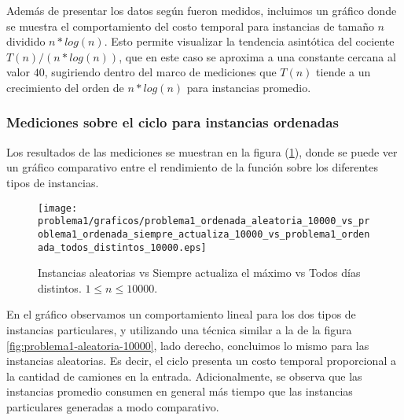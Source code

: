 Además de presentar los datos según fueron medidos, incluimos un gráfico donde se muestra el comportamiento del costo temporal para instancias de tamaño $n$ dividido $n * log(n)$. Esto permite visualizar la tendencia asintótica del cociente $T(n) / (n * log(n))$, que en este caso se aproxima a una constante cercana al valor $40$, sugiriendo dentro del marco de mediciones que $T(n)$ tiende a un crecimiento del orden de $n * log(n)$ para instancias promedio.

\subsubsection{Mediciones sobre el ciclo para instancias ordenadas}

Los resultados de las mediciones se muestran en la figura (\ref{fig:problema1-ordenadas-comparacion}), donde se puede ver un gráfico comparativo entre el rendimiento de la función sobre los diferentes tipos de instancias.

  \begin{figure}[H]
    \begin{center}
    \texttt{[image: problema1/graficos/problema1\_ordenada\_aleatoria\_10000\_vs\_problema1\_ordenada\_siempre\_actualiza\_10000\_vs\_problema1\_ordenada\_todos\_distintos\_10000.eps]}
    \end{center}
    \caption{Instancias aleatorias vs Siempre actualiza el máximo vs Todos días distintos. $1 \leq n \leq 10000$.}
    \label{fig:problema1-ordenadas-comparacion}
  \end{figure}

En el gráfico observamos un comportamiento lineal para los dos tipos de instancias particulares, y utilizando una técnica similar a la de la figura \ref{fig:problema1-aleatoria-10000}, lado derecho, concluimos lo mismo para las instancias aleatorias. Es decir, el ciclo presenta un costo temporal proporcional a la cantidad de camiones en la entrada. Adicionalmente, se observa que las instancias promedio consumen en general más tiempo que las instancias particulares generadas a modo comparativo.






